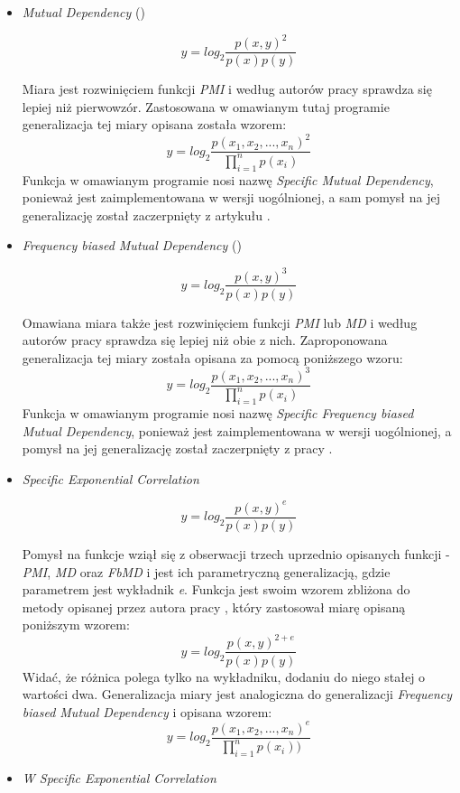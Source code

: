 \documentclass[11pt,a4paper]{llncs}
\begin{document}
\begin{itemize}
\item \emph{Mutual Dependency} (\cite[str. 2]{fbmd})

$$ y = log_{2}\frac{p(x, y)^{2}}{p(x)p(y)} $$


Miara jest rozwinięciem funkcji \emph{PMI} i według autorów pracy \cite{fbmd} sprawdza się lepiej niż pierwowzór.
Zastosowana w omawianym tutaj programie generalizacja tej miary opisana została wzorem:
$$ y = log_{2}\frac{p(x_{1}, x_{2}, ..., x_{n})^{2}}{\prod_{i = 1}^{n}p(x_{i})} $$
Funkcja w omawianym programie nosi nazwę \emph{Specific Mutual Dependency}, ponieważ jest zaimplementowana w wersji uogólnionej, a sam pomysł na jej generalizację został zaczerpnięty z artykułu \cite{mmi_w11}.


\item \emph{Frequency biased Mutual Dependency} (\cite[str. 2]{fbmd})

$$ y = log_{2}\frac{p(x, y)^{3}}{p(x)p(y)} $$


Omawiana miara także jest rozwinięciem funkcji \emph{PMI} lub \emph{MD} i według autorów pracy \cite{fbmd} sprawdza się lepiej niż obie z nich.
Zaproponowana generalizacja tej miary została opisana za pomocą poniższego wzoru:
$$ y = log_{2}\frac{p(x_{1}, x_{2}, ..., x_{n})^{3}}{\prod_{i = 1}^{n} p(x_{i})} $$
Funkcja w omawianym programie nosi nazwę \emph{Specific Frequency biased Mutual Dependency}, ponieważ jest zaimplementowana w wersji uogólnionej, a pomysł na jej generalizację został zaczerpnięty z pracy \cite{mmi_w11}.


\item \emph{Specific Exponential Correlation}

$$ y = log_{2}\frac{p(x, y)^{e}}{p(x)p(y)} $$


Pomysł na funkcje wziął się z obserwacji trzech uprzednio opisanych funkcji - \emph{PMI}, \emph{MD} oraz \emph{FbMD} i jest ich parametryczną generalizacją, gdzie parametrem jest wykładnik \emph{e}.
Funkcja jest swoim wzorem zbliżona do metody opisanej przez autora pracy \cite{buczynski}, który zastosował miarę opisaną poniższym wzorem:
$$ y = log_{2}\frac{p(x, y)^{2 + e}}{p(x)p(y)} $$
Widać, że różnica polega tylko na wykładniku, dodaniu do niego stałej o wartości dwa.
Generalizacja miary jest analogiczna do generalizacji \emph{Frequency biased Mutual Dependency} i opisana wzorem:
$$ y = log_{2}\frac{p(x_{1}, x_{2}, ..., x_{n})^{e}}{\prod_{i = 1}^{n} p(x_{i}))} $$


\item \emph{W Specific Exponential Correlation}


\end{itemize}
\end{document}
